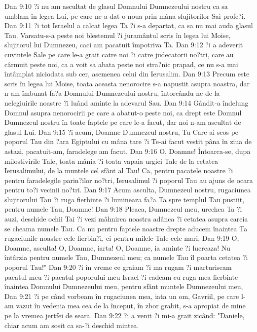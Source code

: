 Dan 9:10  ?i nu am ascultat de glasul Domnului Dumnezeului nostru ca sa umblam în legea Lui, pe care ne-a dat-o noua prin mâna slujitorilor Sai profe?i.
Dan 9:11  ?i tot Israelul a calcat legea Ta ?i s-a departat, ca sa nu mai auda glasul Tau. Varsatu-s-a peste noi blestemul ?i juramântul scris în legea lui Moise, slujitorul lui Dumnezeu, caci am pacatuit împotriva Ta.
Dan 9:12  ?i a adeverit cuvintele Sale pe care le-a grait catre noi ?i catre judecatorii no?tri, care au cârmuit peste noi, ca a voit sa abata peste noi stra?nic prapad, ce nu s-a mai întâmplat niciodata sub cer, asemenea celui din Ierusalim.
Dan 9:13  Precum este scris în legea lui Moise, toata aceasta nenorocire s-a napustit asupra noastra, dar n-am îmbunat fa?a Domnului Dumnezeului nostru, întorcându-ne de la nelegiuirile noastre ?i luând aminte la adevarul Sau.
Dan 9:14  Gândit-a îndelung Domnul asupra nenorocirii pe care a abatut-o peste noi, ca drept este Domnul Dumnezeul nostru în toate faptele pe care le-a facut, dar noi n-am ascultat de glasul Lui.
Dan 9:15  ?i acum, Doamne Dumnezeul nostru, Tu Care ai scos pe poporul Tau din ?ara Egiptului cu mâna tare ?i Te-ai facut vestit pâna în ziua de astazi, pacatuit-am, faradelege am facut.
Dan 9:16  O, Doamne! Întoarca-se, dupa milostivirile Tale, toata mânia ?i toata vapaia urgiei Tale de la cetatea Ierusalimului, de la muntele cel sfânt al Tau! Ca, pentru pacatele noastre ?i pentru faradelegile parin?ilor no?tri, Ierusalimul ?i poporul Tau au ajuns de ocara pentru to?i vecinii no?tri.
Dan 9:17  Acum asculta, Dumnezeul nostru, rugaciunea slujitorului Tau ?i ruga fierbinte ?i lumineaza fa?a Ta spre templul Tau pustiit, pentru numele Tau, Doamne!
Dan 9:18  Pleaca, Dumnezeul meu, urechea Ta ?i auzi, deschide ochii Tai ?i vezi mâhnirea noastra adânca ?i cetatea asupra careia se cheama numele Tau. Ca nu pentru faptele noastre drepte aducem înaintea Ta rugaciunile noastre cele fierbin?i, ci pentru milele Tale cele mari.
Dan 9:19  O, Doamne, asculta! O, Doamne, iarta! O, Doamne, ia aminte ?i lucreaza! Nu întârzia pentru numele Tau, Dumnezeul meu; ca numele Tau îl poarta cetatea ?i poporul Tau!"
Dan 9:20  ?i în vreme ce graiam ?i ma rugam ?i marturiseam pacatul meu ?i pacatul poporului meu Israel ?i cadeam cu ruga mea fierbinte înaintea Domnului Dumnezeului meu, pentru sfânt muntele Dumnezeului meu,
Dan 9:21  ?i pe când vorbeam în rugaciunea mea, iata un om, Gavriil, pe care l-am vazut în vedenia mea cea de la început, în zbor grabit, s-a apropiat de mine pe la vremea jertfei de seara.
Dan 9:22  ?i a venit ?i mi-a grait zicând: "Daniele, chiar acum am sosit ca sa-?i deschid mintea.
